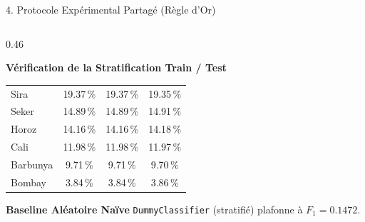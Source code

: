 \documentclass[aspectratio=169,10pt]{beamer}
\begin{document}
\begin{frame}{4. Protocole Expérimental Partagé (Règle d'Or)}
\begin{columns}[T]
\begin{column}{0.46\textwidth}
\begin{block}{\textbf{Vérification de la Stratification Train / Test}}
\begin{tabular}{@{}lccc@{}}
                    Sira     & 19.37\,\% & 19.37\,\% & 19.35\,\% \\
                    Seker    & 14.89\,\% & 14.89\,\% & 14.91\,\% \\
                    Horoz    & 14.16\,\% & 14.16\,\% & 14.18\,\% \\
                    Cali     & 11.98\,\% & 11.98\,\% & 11.97\,\% \\
                    Barbunya & 9.71\,\%  & 9.71\,\%  & 9.70\,\%  \\
                    Bombay   & 3.84\,\%  & 3.84\,\%  & 3.86\,\%  \\
                    \bottomrule
                \end{tabular}
            \end{block}
            \vspace{0.1cm}
            \begin{exampleblock}{\textbf{Baseline Aléatoire Naïve}}
                \footnotesize \texttt{DummyClassifier} (stratifié) plafonne à $F_1 = \mathbf{0.1472}$.
            \end{exampleblock}
        \end{column}
    \end{columns}
\end{frame}
\end{document}

